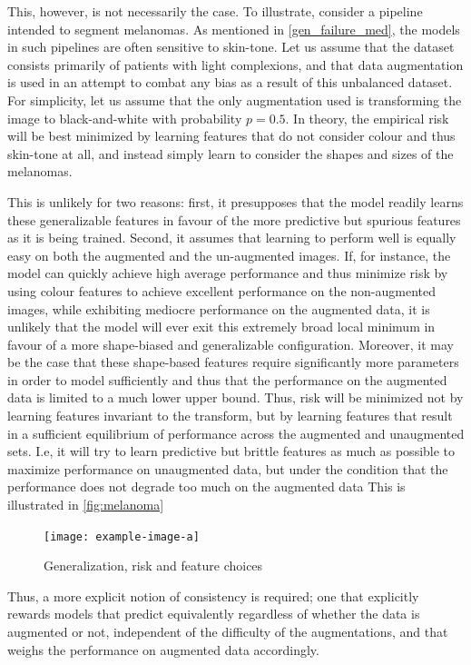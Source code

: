     This, however, is not necessarily the case. To illustrate, consider a pipeline intended to segment melanomas. As mentioned in \autoref{gen_failure_med}, the models in such pipelines are often sensitive to skin-tone. Let us assume that the dataset consists primarily of patients with light complexions, and that data augmentation is used in an attempt to combat any bias as a result of this unbalanced dataset. For simplicity, let us assume that the only augmentation used is transforming the image to black-and-white with probability \(p=0.5\). In theory, the empirical risk will be best minimized by learning features that do not consider colour and thus skin-tone at all, and instead simply learn to consider the shapes and sizes of the melanomas. 
    
    This is unlikely for two reasons: first, it presupposes that the model readily learns these generalizable features in favour of the more predictive but spurious features as it is being trained. Second, it assumes that learning to perform well is equally easy on both the augmented and the un-augmented images. If, for instance, the model can quickly achieve high average performance and thus minimize risk by using colour features to achieve excellent performance on the non-augmented images, while exhibiting mediocre performance on the augmented data, it is unlikely that the model will ever exit this extremely broad local minimum in favour of a more shape-biased and generalizable configuration. Moreover, it may be the case that these shape-based features require significantly more parameters in order to model sufficiently and thus that the performance on the augmented data is limited to a much lower upper bound. Thus, risk will be minimized not by learning features invariant to the transform, but by learning features that result in a sufficient equilibrium of performance across the augmented and unaugmented sets. I.e, it will try to learn predictive but brittle features as much as possible to maximize performance on unaugmented data, but under the condition that the performance does not degrade too much on the augmented data This is illustrated in \autoref{fig:melanoma}
    
    \begin{figure}
        \centering
        \texttt{[image: example-image-a]}
        \caption{Generalization, risk and feature choices}
        \label{fig:melanoma}
    \end{figure}
    
    Thus, a more explicit notion of consistency is required; one that explicitly rewards models that predict equivalently regardless of whether the data is augmented or not, independent of the difficulty of the augmentations, and that weighs the performance on augmented data accordingly. 
    
